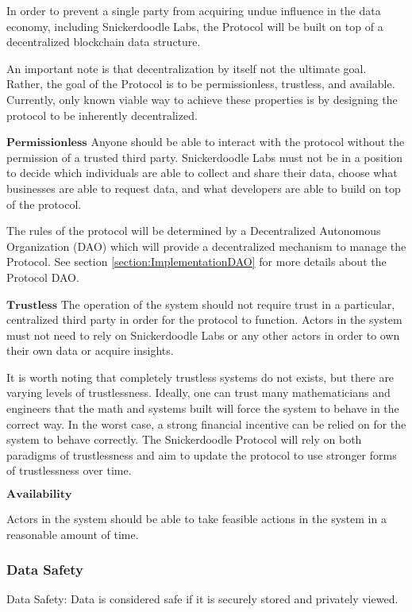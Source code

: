 In order to prevent a single party from acquiring undue influence in the data economy, including Snickerdoodle Labs, the Protocol will be built on top of a 
decentralized blockchain data structure. 

An important note is that decentralization by itself not the ultimate goal. Rather, the goal of the Protocol is to be permissionless, trustless, and available. 
Currently, only known viable way to achieve these properties is by designing the protocol to be inherently decentralized.

$\mathbf{Permissionless}$
Anyone should be able to interact with the protocol without the permission of a trusted third party. Snickerdoodle Labs must not be in a position to decide which individuals 
are able to collect and share their data, choose what businesses are able to request data, and what developers are able to build on top of the protocol. 

The rules of the protocol will be determined by a Decentralized Autonomous Organization (DAO) which will provide a decentralized mechanism to manage the Protocol. 
See section \ref{section:ImplementationDAO} for more details about the Protocol DAO.

$\mathbf{Trustless}$
The operation of the system should not require trust in a particular, centralized third party in order for the protocol to function.  Actors in the system must not 
need to rely on Snickerdoodle Labs or any other actors in order to own their own data or acquire insights.

It is worth noting that completely trustless systems do not exists, but there are varying levels of trustlessness. Ideally, one can trust many mathematicians 
and engineers that the math and systems built will force the system to behave in the correct way. In the worst case, a strong financial incentive can be relied on for 
the system to behave correctly. The Snickerdoodle Protocol will rely on both paradigms of trustlessness and aim to update the protocol to use stronger forms of trustlessness 
over time.

$\mathbf{Availability}$

Actors in the system should be able to take feasible actions in the system in a reasonable amount of time.

\subsubsection{Data Safety}
\begin{definition}
\label{definition:DataSafety}
Data Safety: Data is considered safe if it is securely stored and privately viewed.
\end{definition}

